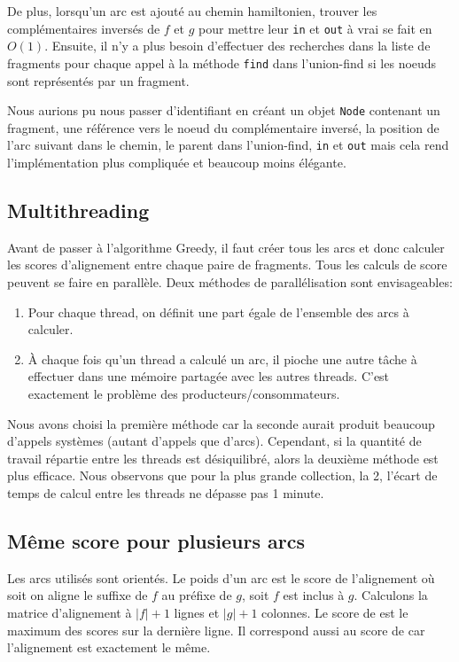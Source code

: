 De plus, lorsqu'un arc  est ajouté au chemin hamiltonien,
trouver les complémentaires inversés de $f$ et $g$ pour mettre
leur \texttt{in} et \texttt{out} à vrai se fait en $O(1)$.
Ensuite, il n'y a plus besoin d'effectuer des recherches dans
la liste de fragments pour chaque appel à la méthode \texttt{find}
dans l'union-find si les noeuds sont représentés par un fragment.

Nous aurions pu nous passer d'identifiant en créant un objet \texttt{Node}
contenant un fragment, une référence vers le noeud du complémentaire inversé,
la position de l'arc suivant dans le chemin,
le parent dans l'union-find, \texttt{in} et \texttt{out} mais
cela rend l'implémentation plus compliquée et beaucoup moins élégante.

\subsection{Multithreading}\label{multithreading}
Avant de passer à l'algorithme Greedy, il faut créer tous les arcs et donc
calculer les scores d'alignement entre chaque paire de fragments.
Tous les calculs de score peuvent se faire en parallèle.
Deux méthodes de parallélisation sont envisageables:
\begin{enumerate}
\item Pour chaque thread, on définit une part égale de l'ensemble des arcs à calculer.
\item À chaque fois qu'un thread a calculé un arc, il pioche une autre tâche à
	effectuer dans une mémoire partagée avec les autres threads.
	C'est exactement le problème des producteurs/consommateurs. %
\end{enumerate}
Nous avons choisi la première méthode car la seconde aurait produit beaucoup d'appels systèmes (autant d'appels que d'arcs).
Cependant, si la quantité de travail répartie entre les threads est désiquilibré, alors la deuxième méthode est plus efficace.
Nous observons que pour la plus grande collection, la 2, l'écart de temps de calcul entre les threads ne dépasse pas 1 minute.

\subsection{Même score pour plusieurs arcs}\label{sec:1m4s}
Les arcs utilisés sont orientés. Le poids d'un arc  est
le score de l'alignement où soit on aligne le suffixe de $f$ au préfixe de $g$,
soit $f$ est inclus à $g$. Calculons la matrice d'alignement à $|f|+1$ lignes et $|g|+1$ colonnes.
Le score de  est le maximum des scores sur la dernière ligne.
Il correspond aussi au score de  car l'alignement est exactement le même.\\


